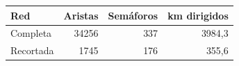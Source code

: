 \begin{tabular}{lrrr}
\toprule
Red & Aristas & Semáforos & km dirigidos \\
\midrule
Completa & 34256 & 337 & 3984,3 \\
Recortada & 1745 & 176 & 355,6 \\
\bottomrule
\end{tabular}

